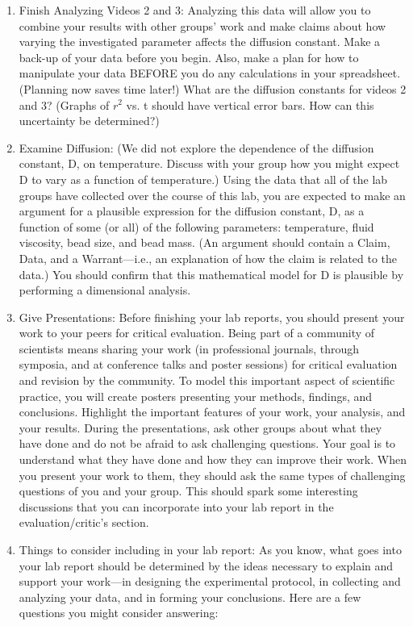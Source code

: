 \begin{enumerate}
\item Finish Analyzing Videos 2 and 3: Analyzing this data will allow you to combine your results with other groups' work and make claims about how varying the investigated parameter affects the diffusion constant. Make a back-up of your data before you begin. Also, make a plan for how to manipulate your data BEFORE you do any calculations in your spreadsheet. (Planning now saves time later!) What are the diffusion constants for videos 2 and 3? (Graphs of $r^{2}$ vs. t should have vertical error bars. How can this uncertainty be determined?)
\item Examine Diffusion: (We did not explore the dependence of the diffusion constant, D, on temperature. Discuss with your group how you might expect D to vary as a function of temperature.) Using the data that all of the lab groups have collected over the course of this lab, you are expected to make an argument for a plausible expression for the diffusion constant, D, as a function of some (or all) of the following parameters: temperature, fluid viscosity, bead size, and bead mass. (An argument should contain a Claim, Data, and a Warrant—i.e., an explanation of how the claim is related to the data.) You should confirm that this mathematical model for D is plausible by performing a dimensional analysis.
\item Give Presentations: Before finishing your lab reports, you should present your work to your peers for critical evaluation. Being part of a community of scientists means sharing your work (in professional journals, through symposia, and at conference talks and poster sessions) for critical evaluation and revision by the community. To model this important aspect of scientific practice, you will create posters presenting your methods, findings, and conclusions. Highlight the important features of your work, your analysis, and your results. During the presentations, ask other groups about what they have done and do not be afraid to ask challenging questions. Your goal is to understand what they have done and how they can improve their work. When you present your work to them, they should ask the same types of challenging questions of you and your group. This should spark some interesting discussions that you can incorporate into your lab report in the evaluation/critic's section.
\item Things to consider including in your lab report: As you know, what goes into your lab report should be determined by the ideas necessary to explain and support your work—in designing the experimental protocol, in collecting and analyzing your data, and in forming your conclusions. Here are a few questions you might consider answering:

\end{enumerate}
